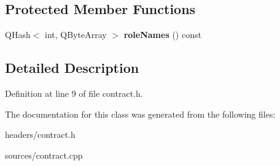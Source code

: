 \subsection*{Protected Member Functions}
\begin{DoxyCompactItemize}
\item 
\mbox{\label{class_con_model_a9752bc78332c8ef9b2fe65af3c30afc8}} 
Q\+Hash$<$ int, Q\+Byte\+Array $>$ {\bfseries role\+Names} () const
\end{DoxyCompactItemize}


\subsection{Detailed Description}


Definition at line 9 of file contract.\+h.



The documentation for this class was generated from the following files\+:\begin{DoxyCompactItemize}
\item 
headers/contract.\+h\item 
sources/contract.\+cpp\end{DoxyCompactItemize}
